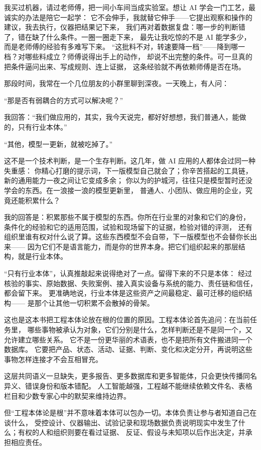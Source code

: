 我买过机器，请过老师傅，把一间小车间当成实验室。想让 AI 学会一门工艺，最诚实的办法是陪它一起学：
它不会伸手，我就替它伸手——它提出观察和操作的建议，我去执行，仪器把结果记下来，
我们再对着数据复盘：哪一步的判断错了，错在缺了什么条件。一圈一圈走下来，
最先让我吃惊的不是 AI 能学多少，而是老师傅的经验有多难写下来。
“这批料不对，转速要降一档”——降到哪一档？对哪些料成立？师傅说得出手上的动作，
却说不出完整的条件。可一旦真的把条件逼问出来、写成规则、连上证据，
这条经验就不再依赖师傅是否在场。

那段时间，我常在一个几位朋友的小群里聊到深夜。一天晚上，有人问：

“那是否有弱耦合的方式可以解决呢？”

我回答：“我们做应用的，其实，我今天说完，都好好想想，我们普通人，能做的，只有行业本体。”

“其他，模型一更新，就被吃掉了。”

这不是一个技术判断，是一个生存判断。这几年，做 AI 应用的人都体会过同一种失重感：
你精心打磨的提示词，下一版模型自己就会了；你辛苦搭起的工具链，新的通用能力一夜之间让它变成多余；
你以为的护城河，往往只是模型暂时还没学会的东西。在一浪接一浪的模型更新里，
普通人、小团队、做应用的企业，究竟还能积累什么？

我的回答是：积累那些不属于模型的东西。你所在行业里的对象和它们的身份，
条件化的经验和它的适用范围，试验和现场留下的证据，检验对错的评测，
还有组织里谁有权对什么说了算。这些东西模型不会自带，下一版模型也不会替你长出来——
因为它们不是语言能力，而是你的世界本身。把它们组织起来的那层结构，就是行业本体。

“只有行业本体”，认真推敲起来说得绝对了一点。留得下来的不只是本体：
经过核验的事实、原始数据、失败案例、接入真实设备与系统的能力、责任链和信任，都会留下来。
更准确地说，行业本体是这些资产之间最稳定、最可迁移的组织结构——
是那个让其他一切积累不会散掉的骨架。

这也是这本书把工程本体论放在根的位置的原因。工程本体论首先追问：在当前任务里，
哪些事物被承认为对象，它们分别是什么，怎样判断还是不是同一个，又允许建立哪些关系。
它不是一份更华丽的术语表，也不是把所有文件搬进同一个数据库。
它要把产品、状态、活动、证据、判断、变化和决定分开，再说明这些事物怎样连接才不会互相冒充。

这层共同语义一旦缺失，更多报告、更多数据库和更多智能体，只会更快传播同名异义、错误身份和版本错配。
人工智能越强，工程越不能继续依赖文件名、表格栏目和少数专家心中的默契来维持边界。

但“工程本体论是根”并不意味着本体可以包办一切。本体负责让参与者知道自己在谈什么，
受控设计、仪器输出、试验记录和现场数据负责说明现实中发生了什么；有权的人和组织则要在看过证据、
反证、假设与未知项以后作出决定，并承担相应责任。

